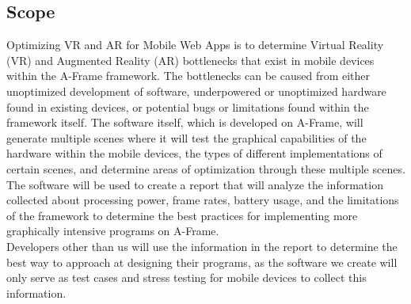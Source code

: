 \documentclass[letterpaper,10pt,titlepage,draftclsnofoot,onecolumn,compsoc,utf8,latin1]{IEEEtran}
\begin{document}
\subsection{Scope}
\begin{singlespace}
\noindent
Optimizing VR and AR for Mobile Web Apps is to determine Virtual Reality (VR) and Augmented Reality (AR) bottlenecks that exist in mobile devices within the A-Frame framework. The bottlenecks can be caused from either unoptimized development of software, underpowered or unoptimized hardware found in existing devices, or potential bugs or limitations found within the framework itself. The software itself, which is developed on A-Frame, will generate multiple scenes where it will test the graphical capabilities of the hardware within the mobile devices, the types of different implementations of certain scenes, and determine areas of optimization through these multiple scenes. The software will be used to create a report that will analyze the information collected about processing power, frame rates, battery usage, and the limitations of the framework to determine the best practices for implementing more graphically intensive programs on A-Frame. \\

\noindent
Developers other than us will use the information in the report to determine the best way to approach at designing their programs, as the software we create will only serve as test cases and stress testing for mobile devices to collect this information. 
\end{singlespace}
\end{document}
